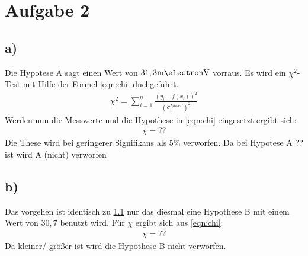 \newpage
\section{Aufgabe 2}

\subsection{a)}
\label{sec:A2a}
Die Hypotese A sagt einen Wert von $31,3\si{\milli\electron\volt}$
vorraus.
Es wird ein $\chi^2$-Test mit Hilfe der Formel \ref{eqn:chi}
duchgeführt.
\begin{align}
  \chi^2=\sum_{i=1}^n\frac{(y_i-f(x_i))^2}{(\sigma_i^{Modell})^2}\label{eqn:chi}
\end{align}
Werden nun die Messwerte und die Hypothese in \eqref{eqn:chi} eingesetzt ergibt sich:
\begin{align}
  \chi=??
\end{align}
Die These wird bei
geringerer Signifikans als $5\%$ verworfen.
Da \chi bei Hypotese A ?? ist wird A (nicht) verworfen
\subsection{b)}
Das vorgehen ist identisch zu \ref{sec:A2a} nur
das diesmal eine Hypothese B mit einem Wert von $30,7$
benutzt wird.
Für $\chi$ ergibt sich aus \eqref{eqn:chi}:
\begin{align}
  \chi=??
\end{align}
Da \chi kleiner/ größer ist wird die Hypothese B nicht verworfen.
